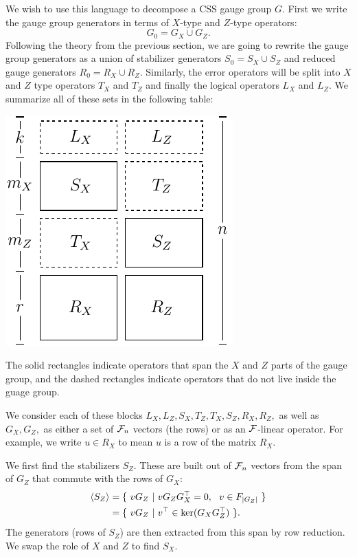 We wish to use this language to decompose a CSS gauge group $G.$
First we write the gauge group generators in terms of
$X$-type and $Z$-type operators:
$$
    G_0 = G_X \cup G_Z.
$$
Following the theory from the previous section,
we are going to rewrite the gauge group generators
as a union of stabilizer generators $S_0 = S_X \cup S_Z$
and reduced gauge generators $R_0 = R_X \cup R_Z.$
Similarly, the error operators
will be split into $X$ and $Z$ type
operators $T_X$ and $T_Z$ and
finally the logical operators
$L_X$ and $L_Z.$
We summarize all of these sets
in the following table:
\begin{center}
\includegraphics[]{pic-symplectic.pdf}
\end{center}
The solid rectangles indicate operators that
span the $X$ and $Z$ parts of the gauge group,
and the dashed rectangles indicate operators that
do not live inside the guage group.

We consider each of these blocks 
$L_X, L_Z, S_X, T_Z, T_X, S_Z, R_X, R_Z,$
as well as $G_X,G_Z,$
as either a set of $\mathcal{F}_{n}$ vectors (the rows) or as an 
$\mathcal{F}$-linear operator.
For example, we write $u\in R_X$ to mean $u$ is 
a row of the matrix $R_X$.

We first find the stabilizers $S_Z$.
These are built out of $\mathcal{F}_{n}$ vectors from the span of $G_Z$
that commute with the rows of $G_X:$
\begin{align*}
    \Span{S_Z} &= \{\  vG_Z \ |\  v G_Z G_X^\top = 0, \ \ v \in F_{|G_Z|}\ \} \\
               &= \{\  vG_Z \ |\  v^\top \in \Ker(G_X G_Z^\top)  \ \}.
\end{align*}
The generators (rows of $S_Z$) are then extracted
from this span by row reduction.
We swap the role of $X$ and $Z$ to find $S_X.$

